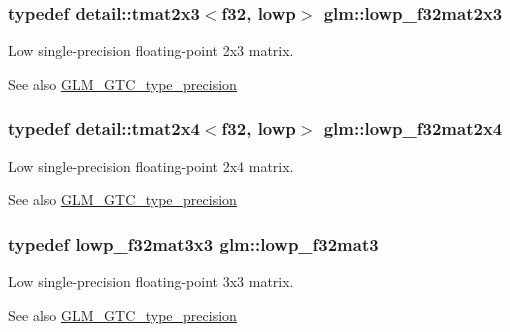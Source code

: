 \subsubsection[{\texorpdfstring{lowp\+\_\+f32mat2x3}{lowp_f32mat2x3}}]{\setlength{\rightskip}{0pt plus 5cm}typedef detail\+::tmat2x3$<$f32, lowp$>$ {\bf glm\+::lowp\+\_\+f32mat2x3}}\hypertarget{group__gtc__type__precision_ga7e45acb54ae2e4f5113a05b08eea5812}{}\label{group__gtc__type__precision_ga7e45acb54ae2e4f5113a05b08eea5812}
Low single-\/precision floating-\/point 2x3 matrix. \begin{DoxySeeAlso}{See also}
\hyperlink{group__gtc__type__precision}{G\+L\+M\+\_\+\+G\+T\+C\+\_\+type\+\_\+precision} 
\end{DoxySeeAlso}
\subsubsection[{\texorpdfstring{lowp\+\_\+f32mat2x4}{lowp_f32mat2x4}}]{\setlength{\rightskip}{0pt plus 5cm}typedef detail\+::tmat2x4$<$f32, lowp$>$ {\bf glm\+::lowp\+\_\+f32mat2x4}}\hypertarget{group__gtc__type__precision_gae0da8e4239df703d44875b49a900c893}{}\label{group__gtc__type__precision_gae0da8e4239df703d44875b49a900c893}
Low single-\/precision floating-\/point 2x4 matrix. \begin{DoxySeeAlso}{See also}
\hyperlink{group__gtc__type__precision}{G\+L\+M\+\_\+\+G\+T\+C\+\_\+type\+\_\+precision} 
\end{DoxySeeAlso}
\subsubsection[{\texorpdfstring{lowp\+\_\+f32mat3}{lowp_f32mat3}}]{\setlength{\rightskip}{0pt plus 5cm}typedef lowp\+\_\+f32mat3x3 {\bf glm\+::lowp\+\_\+f32mat3}}\hypertarget{group__gtc__type__precision_ga84500ab23c0f0f3c585f8ad02f33b88c}{}\label{group__gtc__type__precision_ga84500ab23c0f0f3c585f8ad02f33b88c}
Low single-\/precision floating-\/point 3x3 matrix. \begin{DoxySeeAlso}{See also}
\hyperlink{group__gtc__type__precision}{G\+L\+M\+\_\+\+G\+T\+C\+\_\+type\+\_\+precision} 
\end{DoxySeeAlso}
